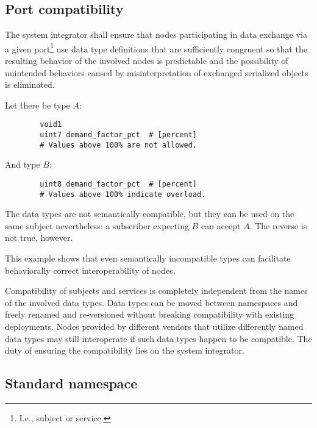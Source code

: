 \subsection{Port compatibility}


The system integrator shall ensure that nodes participating in data exchange via a given port\footnote{%
    I.e., subject or service.
} use data type definitions that are sufficiently congruent so that the resulting behavior of the involved nodes
is predictable and the possibility of unintended behaviors caused by misinterpretation of exchanged serialized
objects is eliminated.

\begin{remark}
    Let there be type $A$:

    \begin{verbatim}
        void1
        uint7 demand_factor_pct  # [percent]
        # Values above 100% are not allowed.
    \end{verbatim}

    And type $B$:

    \begin{verbatim}
        uint8 demand_factor_pct  # [percent]
        # Values above 100% indicate overload.
    \end{verbatim}

    The data types are not semantically compatible, but they can be used on the same subject nevertheless:
    a subscriber expecting $B$ can accept $A$.
    The reverse is not true, however.

    This example shows that even semantically incompatible types can facilitate
    behaviorally correct interoperability of nodes.
\end{remark}

\begin{remark}
    Compatibility of subjects and services is completely independent from the names of the involved data types.
    Data types can be moved between namespaces and freely renamed and re-versioned
    without breaking compatibility with existing deployments.
    Nodes provided by different vendors that utilize differently named data types may
    still interoperate if such data types happen to be compatible.
    The duty of ensuring the compatibility lies on the system integrator.
\end{remark}

\subsection{Standard namespace}

